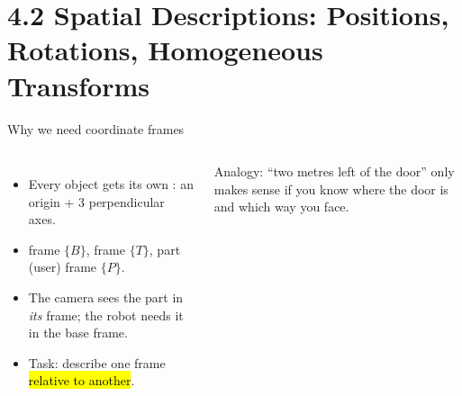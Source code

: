 \documentclass[aspectratio=169,10pt]{beamer}
\newcommand{\triad}[4]{\begin{scope}[shift={(#1,#2)},rotate=#3]
  \draw[ax,mkOrange] (0,0) -- (.7,0) node[right,font=\tiny]{$x_{#4}$};
  \draw[ax,mkMid] (0,0) -- (0,.7) node[above,font=\tiny]{$y_{#4}$};
  \fill[mkNavy] (0,0) circle (.04);\end{scope}}
\begin{document}
\section[4.2 Spatial descriptions]{4.2 Spatial Descriptions: Positions, Rotations, Homogeneous Transforms}

\begin{frame}[t]{Why we need coordinate frames}
\begin{columns}[T,onlytextwidth]
\centering
{}
\begin{itemize}\small
\item Every object gets its own : an origin + 3 perpendicular axes.
\item {} frame $\{B\}$,  frame $\{T\}$, part (user) frame $\{P\}$.
\item The camera sees the part in \emph{its} frame; the robot needs it in the base frame.
\item Task: describe one frame \hl{relative to another}.
\end{itemize}
\begin{notebox}
\small Analogy: ``two metres left of the door'' only makes sense if you know where the door is and which way you face.
\end{notebox}
\end{columns}
\end{frame}
\end{document}
